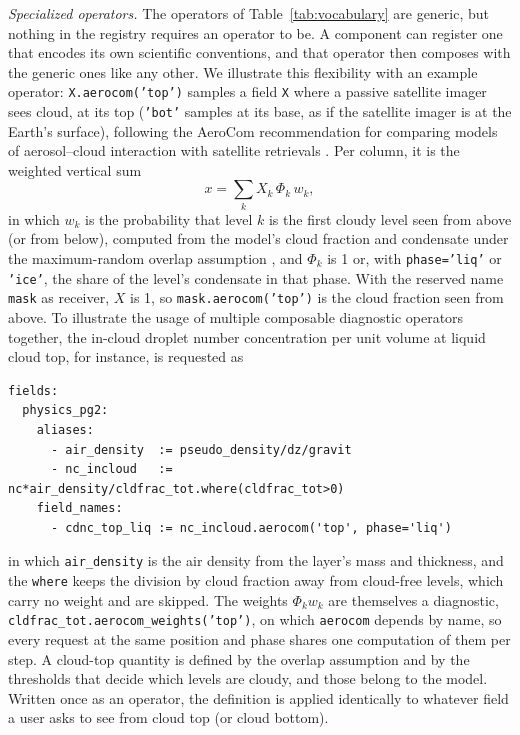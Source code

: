 \documentclass[gmd, manuscript]{copernicus}
\newcommand{\bk}{\discretionary{}{}{}}
\begin{document}
\emph{Specialized operators.} The operators of Table~\ref{tab:vocabulary} are generic, but nothing in the registry requires an operator to be. A component can register one that encodes its own scientific conventions, and that operator then composes with the generic ones like any other. We illustrate this flexibility with an example operator: \texttt{X.aerocom('top')} samples a field \texttt{X} where a passive satellite imager sees cloud, at its top (\texttt{'bot'} samples at its base, as if the satellite imager is at the Earth's surface), following the AeroCom recommendation for comparing models of aerosol--cloud interaction with satellite retrievals \citep{quaas_aerosol_2009}. Per column, it is the weighted vertical sum
\begin{equation}
  x = \sum_k X_k\,\Phi_k\,w_k,
  \label{eq:aerocom}
\end{equation}
in which $w_k$ is the probability that level $k$ is the first cloudy level seen from above (or from below), computed from the model's cloud fraction and condensate under the maximum-random overlap assumption \citep{tiedtke_ecmwf_1979}, and $\Phi_k$ is 1 or, with \texttt{phase='liq'} or \texttt{'ice'}, the share of the level's condensate in that phase. With the reserved name \texttt{mask} as receiver, $X$ is 1, so \texttt{mask.aerocom('top')} is the cloud fraction seen from above. To illustrate the usage of multiple composable diagnostic operators together, the in-cloud droplet number concentration per unit volume at liquid cloud top, for instance, is requested as
\begin{verbatim}
fields:
  physics_pg2:
    aliases:
      - air_density  := pseudo_density/dz/gravit
      - nc_incloud   := nc*air_density/cldfrac_tot.where(cldfrac_tot>0)
    field_names:
      - cdnc_top_liq := nc_incloud.aerocom('top', phase='liq')
\end{verbatim}
in which \texttt{air\_density} is the air density from the layer's mass and thickness, and the \texttt{where} keeps the division by cloud fraction away from cloud-free levels, which carry no weight and are skipped. The weights $\Phi_k w_k$ are themselves a diagnostic, \texttt{cldfrac\_tot.\bk aerocom\_weights('top')}, on which \texttt{aerocom} depends by name, so every request at the same position and phase shares one computation of them per step. A cloud-top quantity is defined by the overlap assumption and by the thresholds that decide which levels are cloudy, and those belong to the model. Written once as an operator, the definition is applied identically to whatever field a user asks to see from cloud top (or cloud bottom).
\end{document}
